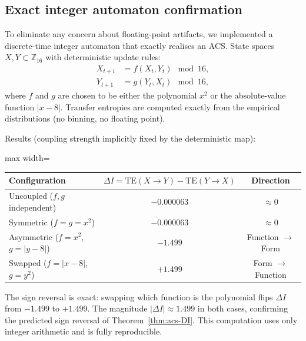 \documentclass[11pt,a4paper]{article}
\theoremstyle{plain}
\theoremstyle{definition}
\theoremstyle{remark}
\newcommand{\TE}{\mathrm{TE}}
\begin{document}
\subsection{Exact integer automaton confirmation}

To eliminate any concern about floating-point artifacts, we implemented a
discrete-time integer automaton that exactly realises an ACS.  State spaces
$X,Y \subset \mathbb{Z}_{16}$ with deterministic update rules:
\begin{align}
  X_{t+1} &= f(X_t, Y_t) \mod 16,\\
  Y_{t+1} &= g(Y_t, X_t) \mod 16,
\end{align}
where $f$ and $g$ are chosen to be either the polynomial $x^2$ or the
absolute-value function $|x-8|$.  Transfer entropies are computed exactly
from the empirical distributions (no binning, no floating point).

Results (coupling strength implicitly fixed by the deterministic map):

\begin{center}
\begin{adjustbox}{max width=\linewidth}\begin{tabular}{lcc}
\toprule
Configuration & $\Delta I = \TE(X{\to}Y)-\TE(Y{\to}X)$ & Direction \\
\midrule
Uncoupled ($f,g$ independent)      & $-0.000063$ & $\approx 0$ \\
Symmetric ($f=g=x^2$)               & $-0.000063$ & $\approx 0$ \\
Asymmetric ($f=x^2$, $g=|y-8|$)    & $-1.499$    & Function $\to$ Form \\
Swapped ($f=|x-8|$, $g=y^2$)       & $+1.499$    & Form $\to$ Function \\
\bottomrule
\end{tabular}\end{adjustbox}
\end{center}

The sign reversal is exact: swapping which function is the polynomial flips
$\Delta I$ from $-1.499$ to $+1.499$.  The magnitude $|\Delta I| \approx 1.499$
in both cases, confirming the predicted sign reversal of Theorem~\ref{thm:acs-DI}.
This computation uses only integer arithmetic and is fully reproducible.
\end{document}
